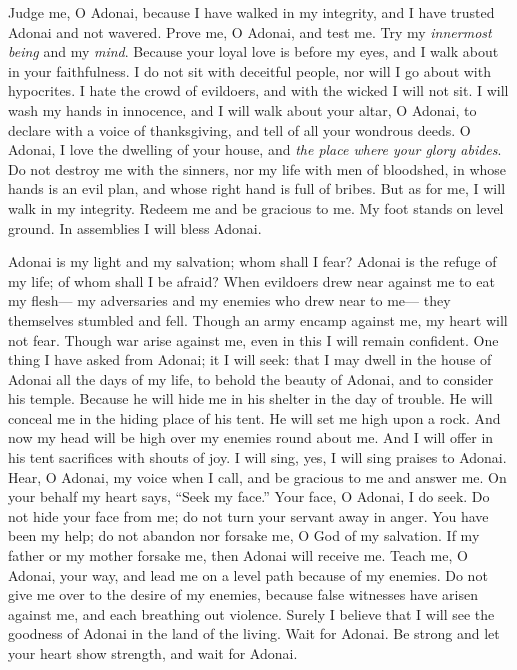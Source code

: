 \begin{biblechapter} %
 Judge me, O Adonai, because I have walked in my integrity, 
and I have trusted Adonai and not wavered.
\verse Prove me, O Adonai, and test me. 
Try my \textit{innermost being} and my \textit{mind}.
\verse Because your loyal love is before my eyes, 
and I walk about in your faithfulness.
\verse I do not sit with deceitful people, 
nor will I go about with hypocrites.
\verse I hate the crowd of evildoers, 
and with the wicked I will not sit.
\verse I will wash my hands in innocence, 
and I will walk about your altar, O Adonai,
\verse to declare with a voice of thanksgiving, 
and tell of all your wondrous deeds.
\verse O Adonai, I love the dwelling of your house, 
and \textit{the place where your glory abides}.
\verse Do not destroy me with the sinners, 
nor my life with men of bloodshed,
\verse in whose hands is an evil plan, 
and whose right hand is full of bribes.
\verse But as for me, I will walk in my integrity. 
Redeem me and be gracious to me.
\verse My foot stands on level ground. 
In assemblies I will bless Adonai.
\end{biblechapter}

\begin{biblechapter} %
 Adonai is my light and my salvation; 
whom shall I fear? 
Adonai is the refuge of my life; 
of whom shall I be afraid?
\verse When evildoers drew near against me to eat my flesh— 
my adversaries and my enemies who drew near to me— 
they themselves stumbled and fell.
\verse Though an army encamp against me, 
my heart will not fear. 
Though war arise against me, 
even in this I will remain confident.
\verse One thing I have asked from Adonai; 
it I will seek: 
that I may dwell in the house of Adonai all the days of my life, 
to behold the beauty of Adonai, 
and to consider his temple.
\verse Because he will hide me in his shelter in the day of trouble. 
He will conceal me in the hiding place of his tent. 
He will set me high upon a rock.
\verse And now my head will be high over my enemies round about me. 
And I will offer in his tent sacrifices with shouts of joy. 
I will sing, yes, I will sing praises to Adonai.
\verse Hear, O Adonai, my voice when I call, 
and be gracious to me and answer me.
\verse On your behalf my heart says, “Seek my face.” 
Your face, O Adonai, I do seek.
\verse Do not hide your face from me; 
do not turn your servant away in anger. 
You have been my help; do not abandon nor forsake me, 
O God of my salvation.
\verse If my father or my mother forsake me, 
then Adonai will receive me.
\verse Teach me, O Adonai, your way, 
and lead me on a level path because of my enemies.
\verse Do not give me over to the desire of my enemies, 
because false witnesses have arisen against me, 
and each breathing out violence.
\verse Surely I believe that I will see the goodness of Adonai 
in the land of the living.
\verse Wait for Adonai. 
Be strong and let your heart show strength, 
and wait for Adonai.
\end{biblechapter}

